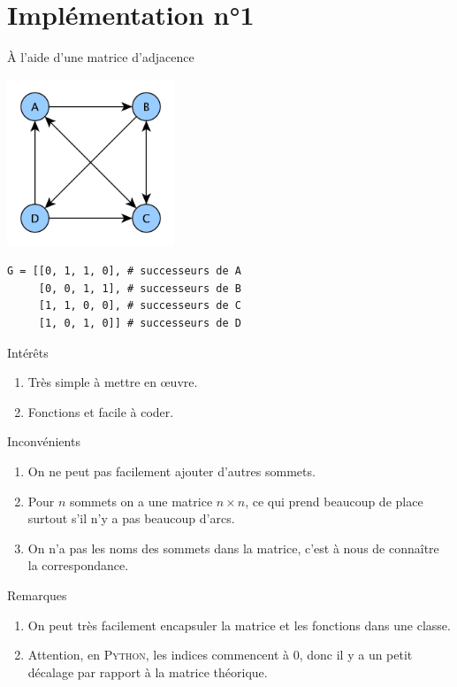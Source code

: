 \documentclass[10pt]{beamer}
\begin{document}
\section*{Implémentation n°1}
\begin{frame}[fragile]{À l'aide d'une matrice d'adjacence}
\begin{center}
\includegraphics[width=5cm]{img/graphe_matrice}
\end{center}
\begin{verbatim}
G = [[0, 1, 1, 0], # successeurs de A
     [0, 0, 1, 1], # successeurs de B
     [1, 1, 0, 0], # successeurs de C
     [1, 0, 1, 0]] # successeurs de D
\end{verbatim}
\end{frame}
\begin{frame}{Intérêts}
\begin{enumerate}[--]
	\item 	Très simple à mettre en \oe uvre.
	\item 	Fonctions  et  facile à coder.
\end{enumerate}
\end{frame}
\begin{frame}{Inconvénients}
\begin{enumerate}[--]
	\item 	On ne peut pas facilement ajouter d'autres sommets.
	\item 	Pour $n$ sommets on a une matrice $n\times n$, ce qui prend beaucoup de place surtout s'il n'y a pas beaucoup d'arcs.
    \item 	On n'a pas les noms des sommets dans la matrice, c'est à nous de connaître la correspondance.
\end{enumerate}
\end{frame}
\begin{frame}{Remarques}
\begin{enumerate}[--]
	\item 	On peut très facilement encapsuler la matrice et les fonctions dans une classe.
	\item 	Attention, en \textsc{Python}, les indices commencent à 0, donc il y a un petit \og décalage\fg{} par rapport à la matrice théorique.	
\end{enumerate}

\end{frame}
\end{document}
